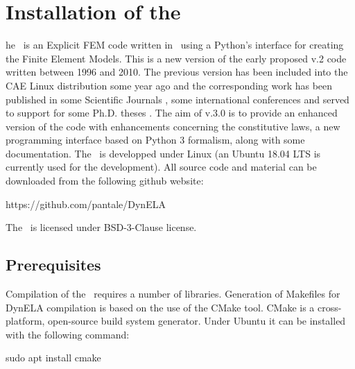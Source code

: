 %
%
%
\chapter{Installation of the \DynELA}\label{Chapter!Installation}

\startcontents[chapters]
\printmyminitoc[1]he \DynELA~is an Explicit FEM code written in \Cpp~using a Python's interface for creating the Finite Element Models. This is a new version of the early proposed v.2 code written between 1996 and 2010. The previous version has been included into the CAE Linux distribution some year ago and the corresponding work has been published in some Scientific Journals \cite{
pantale_object-oriented_2002,
pantale_development_2004,
pantale_parallelization_2005,
menanteau_methodology_2006,
nistor_numerical_2007,
nistor_numerical_2008,
pantale_rp_2020}
, some international conferences \cite{
menanteau_coupled_2005,
nistor_modeling_2005,
pantale_strategies_2005,
pantale_developpement_2004,
pantale_developpement_1999,
pantale_development_2002}
 and served to support for some Ph.D. theses \cite{
menanteau_developpement_2004,
nistor_identification_2005}
. The aim of v.3.0 is to provide an enhanced version of the code with enhancements concerning the constitutive laws, a new programming interface based on Python 3 formalism, along with some documentation.
The \DynELA~is developped under Linux (an Ubuntu 18.04 LTS is currently used for the development). All source code and material can be downloaded from the following github website:

\hspace*{1cm}\textsf{https://github.com/pantale/DynELA}

The \DynELA~is licensed under BSD-3-Clause license.

\section{Prerequisites}

Compilation of the \DynELA~requires a number of libraries.
Generation of Makefiles for DynELA compilation is based on the use of the CMake tool. CMake is a cross-platform, open-source build system generator. Under Ubuntu it can be installed with the following command:

\begin{BashListing}[numbers=none]
sudo apt install cmake
\end{BashListing}

